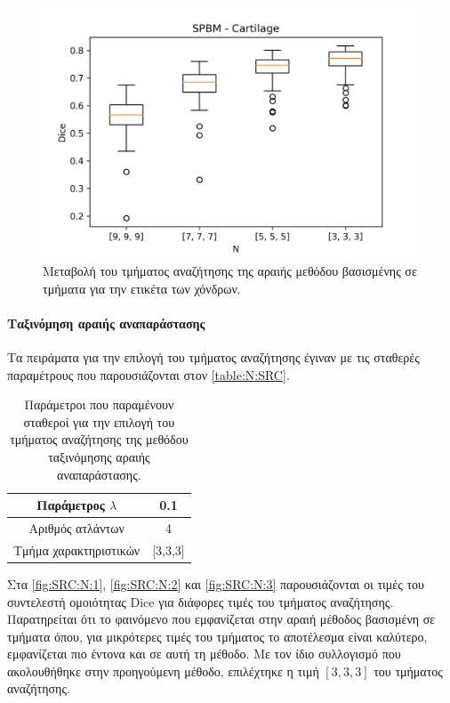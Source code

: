 \documentclass[a4paper,12pt]{article}
\newcommand{\paragraphLine}[1]{\paragraph{#1}\mbox{}}
\begin{document}
\begin{figure}[H]
    \centering
    \includegraphics[width=0.85\linewidth]{SPBM_N_Cartilage_plot.png}
    \caption{Μεταβολή του τμήματος αναζήτησης της αραιής μεθόδου βασισμένης σε
             τμήματα για την ετικέτα των χόνδρων.}
    \label{fig:SPBM:N:3}
\end{figure}

\paragraphLine{Ταξινόμηση αραιής αναπαράστασης}

Τα πειράματα για την επιλογή του τμήματος αναζήτησης έγιναν με τις σταθερές
παραμέτρους που παρουσιάζονται στον \autoref{table:N:SRC}.

\begin{table}[h!]
    \centering
    \begin{tabular}{|c|c|} 
        \hline
        Παράμετρος $\lambda$ & 0.1 \\ 
        \hline
        Αριθμός ατλάντων & 4 \\ 
        \hline
        Τμήμα χαρακτηριστικών & [3,3,3] \\ 
        \hline
    \end{tabular}
    \caption{Παράμετροι που παραμένουν σταθεροί για την επιλογή του τμήματος
             αναζήτησης της μεθόδου ταξινόμησης αραιής αναπαράστασης.}
    \label{table:N:SRC}
\end{table}

Στα \autoref{fig:SRC:N:1}, \autoref{fig:SRC:N:2} και \autoref{fig:SRC:N:3}
παρουσιάζονται οι τιμές του συντελεστή ομοιότητας Dice για διάφορες τιμές του
τμήματος αναζήτησης. Παρατηρείται ότι το φαινόμενο που εμφανίζεται στην αραιή
μέθοδος βασισμένη σε τμήματα όπου, για μικρότερες τιμές του τμήματος το
αποτέλεσμα είναι καλύτερο, εμφανίζεται πιο έντονα και σε αυτή τη μέθοδο. Με τον
ίδιο συλλογισμό που ακολουθήθηκε στην προηγούμενη μέθοδο, επιλέχτηκε η τιμή
$[3,3,3]$ του τμήματος αναζήτησης.
\end{document}
